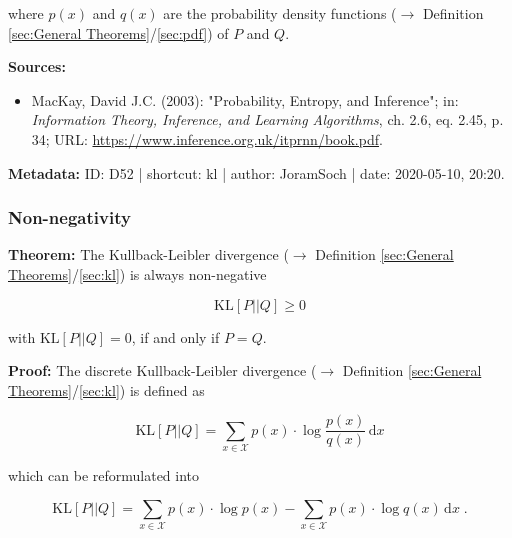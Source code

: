 \documentclass[a4paper,12pt,twoside]{book}
\begin{document}
where $p(x)$ and $q(x)$ are the probability density functions ($\rightarrow$ Definition \ref{sec:General Theorems}/\ref{sec:pdf}) of $P$ and $Q$.


\vspace{1em}
\textbf{Sources:}
\begin{itemize}
\item MacKay, David J.C. (2003): "Probability, Entropy, and Inference"; in: \textit{Information Theory, Inference, and Learning Algorithms}, ch. 2.6, eq. 2.45, p. 34; URL: \url{https://www.inference.org.uk/itprnn/book.pdf}.
\end{itemize}


\vspace{1em}
\textbf{Metadata:} ID: D52 | shortcut: kl | author: JoramSoch | date: 2020-05-10, 20:20.
\vspace{1em}



\subsubsection[\textbf{Non-negativity}]{Non-negativity} \label{sec:kl-nonneg}
\setcounter{equation}{0}

\textbf{Theorem:} The Kullback-Leibler divergence ($\rightarrow$ Definition \ref{sec:General Theorems}/\ref{sec:kl}) is always non-negative

\begin{equation} \label{eq:kl-nonneg-KL-nonneg}
\mathrm{KL}[P||Q] \geq 0
\end{equation}

with $\mathrm{KL}[P \vert \vert Q] = 0$, if and only if $P = Q$.


\vspace{1em}
\textbf{Proof:} The discrete Kullback-Leibler divergence ($\rightarrow$ Definition \ref{sec:General Theorems}/\ref{sec:kl}) is defined as

\begin{equation} \label{eq:kl-nonneg-KL}
\mathrm{KL}[P||Q] = \sum_{x \in \mathcal{X}} p(x) \cdot \log \frac{p(x)}{q(x)} \, \mathrm{d}x
\end{equation}

which can be reformulated into

\begin{equation} \label{eq:kl-nonneg-KL-dev}
\mathrm{KL}[P||Q] = \sum_{x \in \mathcal{X}} p(x) \cdot \log p(x) - \sum_{x \in \mathcal{X}} p(x) \cdot \log q(x) \, \mathrm{d}x \; .
\end{equation}
\end{document}
